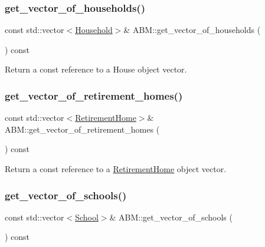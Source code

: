\subsubsection{\texorpdfstring{get\+\_\+vector\+\_\+of\+\_\+households()}{get\_vector\_of\_households()}}
{\footnotesize\ttfamily const std\+::vector$<$\hyperlink{classHousehold}{Household}$>$\& A\+B\+M\+::get\+\_\+vector\+\_\+of\+\_\+households (\begin{DoxyParamCaption}{ }\end{DoxyParamCaption}) const\hspace{0.3cm}{\ttfamily [inline]}}



Return a const reference to a House object vector. 

\mbox{\label{classABM_a1265f522554b325c1495bfb1e5a2e921}} 
\subsubsection{\texorpdfstring{get\+\_\+vector\+\_\+of\+\_\+retirement\+\_\+homes()}{get\_vector\_of\_retirement\_homes()}}
{\footnotesize\ttfamily const std\+::vector$<$\hyperlink{classRetirementHome}{Retirement\+Home}$>$\& A\+B\+M\+::get\+\_\+vector\+\_\+of\+\_\+retirement\+\_\+homes (\begin{DoxyParamCaption}{ }\end{DoxyParamCaption}) const\hspace{0.3cm}{\ttfamily [inline]}}



Return a const reference to a \hyperlink{classRetirementHome}{Retirement\+Home} object vector. 

\mbox{\label{classABM_a6b2883283dd859e05b9c00c5939076a1}} 
\subsubsection{\texorpdfstring{get\+\_\+vector\+\_\+of\+\_\+schools()}{get\_vector\_of\_schools()}}
{\footnotesize\ttfamily const std\+::vector$<$\hyperlink{classSchool}{School}$>$\& A\+B\+M\+::get\+\_\+vector\+\_\+of\+\_\+schools (\begin{DoxyParamCaption}{ }\end{DoxyParamCaption}) const\hspace{0.3cm}{\ttfamily [inline]}}



